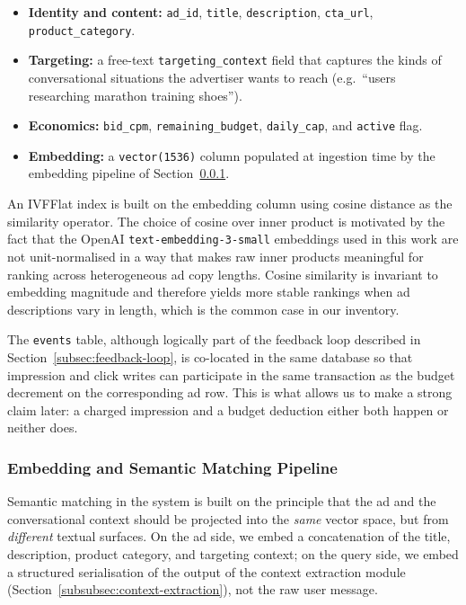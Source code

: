 \begin{itemize}[leftmargin=1.4em,itemsep=2pt]
    \item \textbf{Identity and content:} \texttt{ad\_id}, \texttt{title},
          \texttt{description}, \texttt{cta\_url}, \texttt{product\_category}.
    \item \textbf{Targeting:} a free-text \texttt{targeting\_context} field
          that captures the kinds of conversational situations the advertiser
          wants to reach (e.g.\ ``users researching marathon training shoes'').
    \item \textbf{Economics:} \texttt{bid\_cpm}, \texttt{remaining\_budget},
          \texttt{daily\_cap}, and \texttt{active} flag.
    \item \textbf{Embedding:} a \texttt{vector(1536)} column populated at
          ingestion time by the embedding pipeline of
          Section~\ref{subsubsec:embedding-pipeline}.
\end{itemize}

An IVFFlat index is built on the embedding column using cosine distance as
the similarity operator. The choice of cosine over inner product is motivated
by the fact that the OpenAI \texttt{text-embedding-3-small} embeddings used in
this work are not unit-normalised in a way that makes raw inner products
meaningful for ranking across heterogeneous ad copy lengths. Cosine
similarity is invariant to embedding magnitude and therefore yields more
stable rankings when ad descriptions vary in length, which is the common case
in our inventory.

The \texttt{events} table, although logically part of the feedback loop
described in Section~\ref{subsec:feedback-loop}, is co-located in the same
database so that impression and click writes can participate in the same
transaction as the budget decrement on the corresponding ad row. This is
what allows us to make a strong claim later: a charged impression and a
budget deduction either both happen or neither does.

\subsubsection{Embedding and Semantic Matching Pipeline}
\label{subsubsec:embedding-pipeline}

Semantic matching in the system is built on the principle that the ad and
the conversational context should be projected into the \emph{same} vector
space, but from \emph{different} textual surfaces. On the ad side, we embed
a concatenation of the title, description, product category, and targeting
context; on the query side, we embed a structured serialisation of the
output of the context extraction module
(Section~\ref{subsubsec:context-extraction}), not the raw user message.

